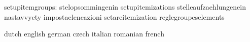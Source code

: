                  setupitemgroups: stelopsommingenin                setupitemizations
                                  stelleaufzaehlungenein           nastavvycty
                                  impostaelencazioni               setareitemization
                                  reglegroupeselements

\stopcommands




\startcommands                    dutch                            english
                                  german                           czech
                                  italian                          romanian
                                  french

